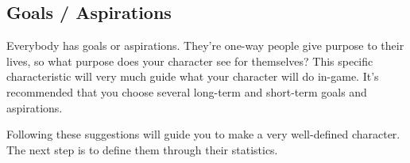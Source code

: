 \subsection{Goals / Aspirations} \label{sec:goals_aspirations}

Everybody has goals or aspirations. They’re one-way people give purpose to their lives, so what purpose does your character see for themselves? This specific characteristic will very much guide what your character will do in-game. It’s recommended that you choose several long-term and short-term goals and aspirations.

Following these suggestions will guide you to make a very well-defined character. The next step is to define them through their statistics.